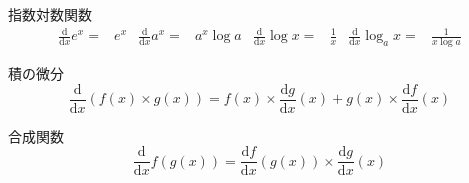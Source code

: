 \documentclass[12pt,b5paper]{ltjsarticle}
\begin{document}
 指数対数関数
\begin{align}
 \frac{\mathrm{d}}{\mathrm{d}x}
  e^x =& e^x
& %
 \frac{\mathrm{d}}{\mathrm{d}x}
  a^x =& a^x \log a
& %
 \frac{\mathrm{d}}{\mathrm{d}x}
  \log x =& \frac{1}{x}
& %
 \frac{\mathrm{d}}{\mathrm{d}x}
  \log_a x =& \frac{1}{x\log a}
\end{align}


\hrulefill


積の微分
\begin{equation}
 \frac{\mathrm{d}}{\mathrm{d}x}
  \left(f(x)\times g(x)\right)
  = f(x)\times \frac{\mathrm{d}g}{\mathrm{d}x}(x)
  + g(x)\times \frac{\mathrm{d}f}{\mathrm{d}x}(x)
\end{equation}

合成関数
\begin{equation}
 \frac{\mathrm{d}}{\mathrm{d}x}
  f(g(x)) =
   \frac{\mathrm{d}f}{\mathrm{d}x}
  (g(x))
  \times
   \frac{\mathrm{d}g}{\mathrm{d}x}
  (x)
\end{equation}

\end{document}
